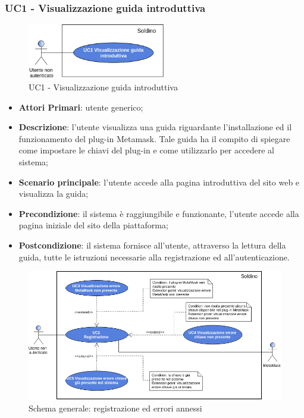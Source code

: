 \subsubsection{UC1 - Visualizzazione guida introduttiva}
\begin{figure}[h]
	\includegraphics[width=6cm]{res/images/UC1-Guida.png}
	\centering
	\caption{UC1 - Visualizzazione guida introduttiva}
\end{figure}
\begin{itemize}
	\item \textbf{Attori Primari}: utente generico;
	\item \textbf{Descrizione}: l'utente visualizza una guida riguardante l'installazione ed il funzionamento del plug-in Metamask\glo. Tale guida ha il compito di spiegare come impostare le chiavi del plug-in e come utilizzarlo per accedere al sistema;
	\item \textbf{Scenario principale}: l'utente accede alla pagina introduttiva del sito web e visualizza la guida;
	\item \textbf{Precondizione}: il sistema è raggiungibile e funzionante, l'utente accede alla pagina iniziale del sito della piattaforma;
	\item \textbf{Postcondizione}: il sistema fornisce all'utente, attraverso la lettura della guida, tutte le istruzioni necessarie alla registrazione ed all'autenticazione.
	
	
\end{itemize}
\begin{figure}[h]
	\includegraphics[width=14cm]{res/images/UC2Registrazione.png}
	\centering
	\caption{Schema generale: registrazione ed errori annessi}
\end{figure}
